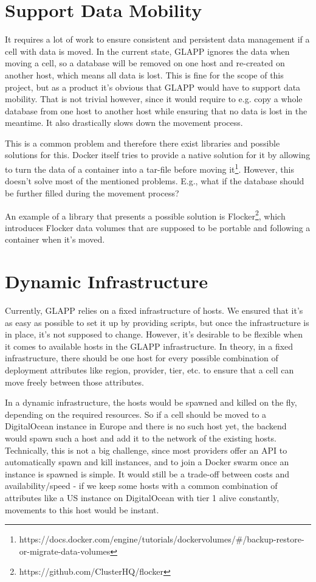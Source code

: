 \documentclass{seal_thesis}
\begin{document}
\section{Support Data Mobility}
It requires a lot of work to ensure consistent and persistent data management if a cell with data is moved.
In the current state, GLAPP ignores the data when moving a cell, so a database will be removed on one host and re-created on another host, which means all data is lost.
This is fine for the scope of this project, but as a product it's obvious that GLAPP would have to support data mobility.
That is not trivial however, since it would require to e.g. copy a whole database from one host to another host while ensuring that no data is lost in the meantime.
It also drastically slows down the movement process.

This is a common problem and therefore there exist libraries and possible solutions for this.
Docker itself tries to provide a native solution for it by allowing to turn the data of a container into a tar-file before moving it\footnote{https://docs.docker.com/engine/tutorials/dockervolumes/\#/backup-restore-or-migrate-data-volumes}.
However, this doesn't solve most of the mentioned problems. E.g., what if the database should be further filled during the movement process?

An example of a library that presents a possible solution is Flocker\footnote{https://github.com/ClusterHQ/flocker}, which introduces Flocker data volumes that are supposed to be portable and following a container when it's moved.


\section{Dynamic Infrastructure}
Currently, GLAPP relies on a fixed infrastructure of hosts.
We ensured that it's as easy as possible to set it up by providing scripts, but once the infrastructure is in place, it's not supposed to change.
However, it's desirable to be flexible when it comes to available hosts in the GLAPP infrastructure.
In theory, in a fixed infrastructure, there should be one host for every possible combination of deployment attributes like region, provider, tier, etc. to ensure that a cell can move freely between those attributes.

In a dynamic infrastructure, the hosts would be spawned and killed on the fly, depending on the required resources. So if a cell should be moved to a DigitalOcean instance in Europe and there is no such host yet, the backend would spawn such a host and add it to the network of the existing hosts.
Technically, this is not a big challenge, since most providers offer an API to automatically spawn and kill instances, and to join a Docker swarm once an instance is spawned is simple.
It would still be a trade-off between costs and availability/speed - if we keep some hosts with a common combination of attributes like a US instance on DigitalOcean with tier 1 alive constantly, movements to this host would be instant.
\end{document}
